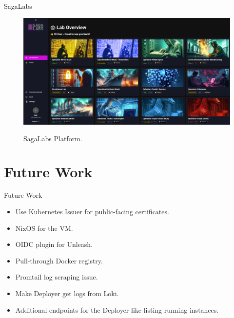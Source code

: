 \documentclass{beamer}
\begin{document}
\begin{frame}{SagaLabs}
    \begin{figure}
        \centering
        \href{https://sagalabs.dk/}{%
            \includegraphics[width=1\textwidth]{./images/SagaLabs.png}
        }
        \caption{SagaLabs Platform.}
    \end{figure}
\end{frame}

\section{Future Work}
\begin{frame}{Future Work}
    \begin{itemize}
        \item Use Kubernetes Issuer for public-facing certificates.
        \item NixOS for the VM.
        \item OIDC plugin for Unleash.
        \item Pull-through Docker registry.
        \item Promtail log scraping issue.
        \item Make Deployer get logs from Loki.
        \item Additional endpoints for the Deployer like listing running instances.
    \end{itemize}
\end{frame}
\end{document}

